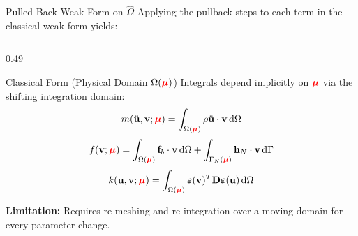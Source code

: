 \begin{frame}{Pulled-Back Weak Form on $\hat{\Omega}$}
  \small
  Applying the pullback steps to each term in the classical weak form yields:
  
  \begin{columns}[T]
    \begin{column}{0.49\textwidth}
      \begin{block}{Classical Form (Physical Domain $\Omega(\textcolor{red}{\boldsymbol{\mu}})$)}
        \footnotesize
        Integrals depend implicitly on $\textcolor{red}{\boldsymbol{\mu}}$ via the shifting integration domain:
        \[
          m(\ddot{\mathbf{u}}, \mathbf{v}; \textcolor{red}{\boldsymbol{\mu}}) = \int_{\Omega(\textcolor{red}{\boldsymbol{\mu}})} \rho \ddot{\mathbf{u}} \cdot \mathbf{v} \,\mathrm{d}\Omega
        \]
        \[
          f(\mathbf{v}; \textcolor{red}{\boldsymbol{\mu}}) = \int_{\Omega(\textcolor{red}{\boldsymbol{\mu}})} \mathbf{f}_b \cdot \mathbf{v} \,\mathrm{d}\Omega + \int_{\Gamma_N(\textcolor{red}{\boldsymbol{\mu}})} \mathbf{h}_N \cdot \mathbf{v} \,\mathrm{d}\Gamma
        \]
        \[
          k(\mathbf{u}, \mathbf{v}; \textcolor{red}{\boldsymbol{\mu}}) = \int_{\Omega(\textcolor{red}{\boldsymbol{\mu}})} \boldsymbol{\varepsilon}(\mathbf{v})^T \mathbf{D} \boldsymbol{\varepsilon}(\mathbf{u}) \,\mathrm{d}\Omega
        \]
        \par\vspace{0.1cm}
        \textbf{Limitation:}
        Requires re-meshing and re-integration over a moving domain for every parameter change.
      \end{block}
    \end{column}
    

\end{columns}
\end{frame}
